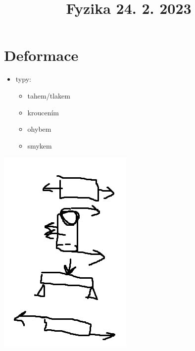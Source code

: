 \documentclass{article}
\title{\vspace{-2cm}Fyzika 24. 2. 2023\vspace{-1.7cm}}
\date{}
\author{}
\begin{document}
\maketitle

\section{Deformace}

  \begin{minipage}{0.25\textwidth}\raggedleft
    \begin{itemize}
      \item typy:
      \begin{itemize}
        \item tahem/tlakem
        \item kroucením
        \item ohybem
        \item smykem
      \end{itemize}
    \end{itemize}
  \end{minipage}
  \hspace{0.5cm}
  \noindent\begin{minipage}{0.12\textwidth}
    \includegraphics[width=0.9\linewidth]{deformace}
  \end{minipage}
\end{document}
